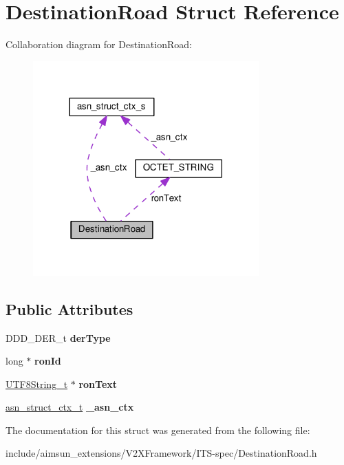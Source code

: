 \hypertarget{structDestinationRoad}{}\section{Destination\+Road Struct Reference}
\label{structDestinationRoad}


Collaboration diagram for Destination\+Road\+:\nopagebreak
\begin{figure}[H]
\begin{center}
\leavevmode
\includegraphics[width=246pt]{structDestinationRoad__coll__graph}
\end{center}
\end{figure}
\subsection*{Public Attributes}
\begin{DoxyCompactItemize}
\item 
D\+D\+D\+\_\+\+D\+E\+R\+\_\+t {\bfseries der\+Type}\hypertarget{structDestinationRoad_a7d3ee1808fd313c5dd820c1104de5fa3}{}\label{structDestinationRoad_a7d3ee1808fd313c5dd820c1104de5fa3}

\item 
long $\ast$ {\bfseries ron\+Id}\hypertarget{structDestinationRoad_ab76490ee665a6ae810fc2e23093759c0}{}\label{structDestinationRoad_ab76490ee665a6ae810fc2e23093759c0}

\item 
\hyperlink{structOCTET__STRING}{U\+T\+F8\+String\+\_\+t} $\ast$ {\bfseries ron\+Text}\hypertarget{structDestinationRoad_af7605d4620d36e606f08c0f0fbb812e5}{}\label{structDestinationRoad_af7605d4620d36e606f08c0f0fbb812e5}

\item 
\hyperlink{structasn__struct__ctx__s}{asn\+\_\+struct\+\_\+ctx\+\_\+t} {\bfseries \+\_\+asn\+\_\+ctx}\hypertarget{structDestinationRoad_ace87b48fb4c89bb9ca990e11d250f132}{}\label{structDestinationRoad_ace87b48fb4c89bb9ca990e11d250f132}

\end{DoxyCompactItemize}


The documentation for this struct was generated from the following file\+:\begin{DoxyCompactItemize}
\item 
include/aimsun\+\_\+extensions/\+V2\+X\+Framework/\+I\+T\+S-\/spec/Destination\+Road.\+h\end{DoxyCompactItemize}
